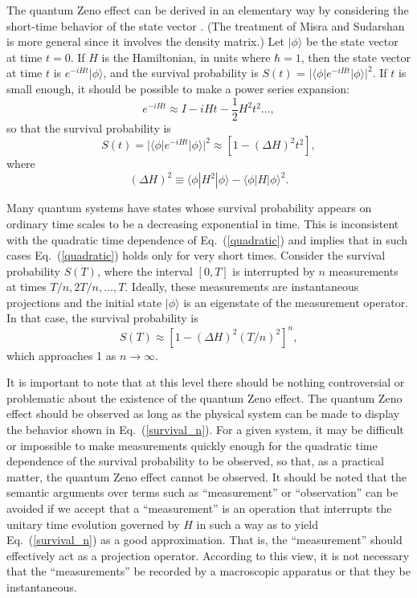 \documentclass[letterpaper]{jpconf}
\begin{document}
The quantum Zeno effect can be derived in an elementary way by
considering the short-time behavior of the state vector
\cite{peres80}.  (The treatment of Misra and Sudarshan
\cite{misra77} is more general since it involves the density
matrix.) Let $|\phi\rangle$ be the state vector at time $t=0$. If
$H$ is the Hamiltonian, in units where $\hbar=1$, then the state
vector at time $t$ is $e^{-iHt}|\phi\rangle$, and the survival
probability is $S(t)$ = $|\langle \phi|e^{-iHt}|\phi\rangle|^2$. If
$t$ is small enough, it should be possible to make a power series
expansion:
\begin{equation}
e^{-iHt} \approx  I -iHt -\frac{1}{2} H^2 t^2
\ldots,\label{quadratic}
\end{equation}
so that the survival probability is
\begin{equation}
S(t) = |\langle \phi|e^{-iHt}|\phi\rangle|^2 \approx [1-(\Delta
H)^2t^2],
\end{equation}
 where
\begin{equation}
(\Delta H)^2 \equiv \langle\phi|H^2|\phi\rangle -
\langle\phi|H|\phi\rangle^2.
\end{equation}

Many quantum systems have states whose survival probability appears
on ordinary time scales to be a decreasing exponential in time. This
is inconsistent with the quadratic time dependence of
Eq.~(\ref{quadratic}) and implies that in such cases
Eq.~(\ref{quadratic}) holds only for very short times. Consider the
survival probability $S(T)$, where the interval $[0,T]$ is
interrupted by $n$ measurements at times $T/n, 2T/n,\ldots,T$.
Ideally, these measurements are instantaneous projections and the
initial state $|\phi\rangle$ is an eigenstate of the measurement
operator. In that case, the survival probability is
\begin{equation}
S(T) \approx [1-(\Delta H)^2(T/n)^2]^n, \label{survival_n}
\end{equation}
which approaches 1 as $n\rightarrow \infty$.

It is important to note that at this level there should be nothing
controversial or problematic about the existence of the quantum Zeno
effect. The quantum Zeno effect should be observed as long as the
physical system can be made to display the behavior shown in
Eq.~(\ref{survival_n}). For a given system, it may be difficult or
impossible to make measurements quickly enough for the quadratic
time dependence of the survival probability to be observed, so that,
as a practical matter, the quantum Zeno effect cannot be observed.
It should be noted that the semantic arguments over terms such as
``measurement'' or ``observation'' can be avoided if we accept that
a ``measurement'' is an operation that interrupts the unitary time
evolution governed by $H$ in such a way as to yield
Eq.~(\ref{survival_n}) as a good approximation. That is, the
``measurement'' should effectively act as a projection operator.
According to this view, it is not necessary that the
``measurements'' be recorded by a macroscopic apparatus or that they
be instantaneous.
\end{document}
